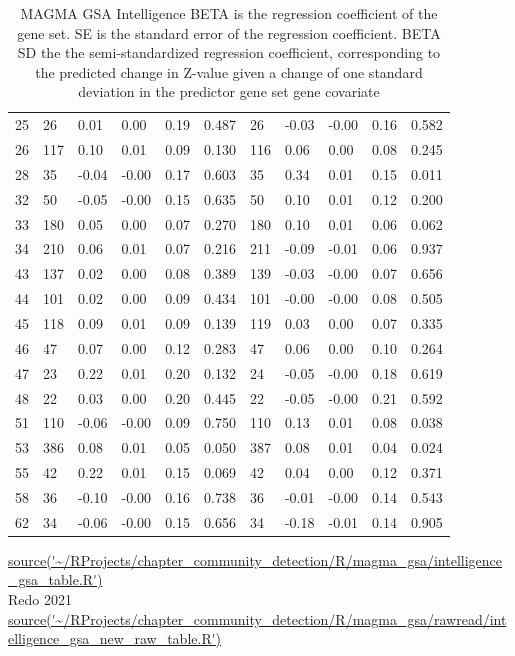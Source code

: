 \begin{table}[ht]
\begin{tabular}{cllllllllll}
  25 & 26 & 0.01 & 0.00 & 0.19 & 0.487 & 26 & -0.03 & -0.00 & 0.16 & 0.582 \\ 
  26 & 117 & 0.10 & 0.01 & 0.09 & 0.130 & 116 & 0.06 & 0.00 & 0.08 & 0.245 \\ 
  28 & 35 & -0.04 & -0.00 & 0.17 & 0.603 & 35 & 0.34 & 0.01 & 0.15 & 0.011 \\ 
  32 & 50 & -0.05 & -0.00 & 0.15 & 0.635 & 50 & 0.10 & 0.01 & 0.12 & 0.200 \\ 
  33 & 180 & 0.05 & 0.00 & 0.07 & 0.270 & 180 & 0.10 & 0.01 & 0.06 & 0.062 \\ 
  34 & 210 & 0.06 & 0.01 & 0.07 & 0.216 & 211 & -0.09 & -0.01 & 0.06 & 0.937 \\ 
  43 & 137 & 0.02 & 0.00 & 0.08 & 0.389 & 139 & -0.03 & -0.00 & 0.07 & 0.656 \\ 
  44 & 101 & 0.02 & 0.00 & 0.09 & 0.434 & 101 & -0.00 & -0.00 & 0.08 & 0.505 \\ 
  45 & 118 & 0.09 & 0.01 & 0.09 & 0.139 & 119 & 0.03 & 0.00 & 0.07 & 0.335 \\ 
  46 & 47 & 0.07 & 0.00 & 0.12 & 0.283 & 47 & 0.06 & 0.00 & 0.10 & 0.264 \\ 
  47 & 23 & 0.22 & 0.01 & 0.20 & 0.132 & 24 & -0.05 & -0.00 & 0.18 & 0.619 \\ 
  48 & 22 & 0.03 & 0.00 & 0.20 & 0.445 & 22 & -0.05 & -0.00 & 0.21 & 0.592 \\ 
  51 & 110 & -0.06 & -0.00 & 0.09 & 0.750 & 110 & 0.13 & 0.01 & 0.08 & 0.038 \\ 
  53 & 386 & 0.08 & 0.01 & 0.05 & 0.050 & 387 & 0.08 & 0.01 & 0.04 & 0.024 \\ 
  55 & 42 & 0.22 & 0.01 & 0.15 & 0.069 & 42 & 0.04 & 0.00 & 0.12 & 0.371 \\ 
  58 & 36 & -0.10 & -0.00 & 0.16 & 0.738 & 36 & -0.01 & -0.00 & 0.14 & 0.543 \\ 
  62 & 34 & -0.06 & -0.00 & 0.15 & 0.656 & 34 & -0.18 & -0.01 & 0.14 & 0.905 \\ 
   \bottomrule
\end{tabular}
\caption{MAGMA GSA Intelligence  BETA is the regression coefficient of the gene set. SE is the standard error of the regression coefficient. BETA SD the the semi-standardized regression coefficient, corresponding to the predicted
change in Z-value given a change of one standard deviation in the predictor gene set  gene covariate } 
\tiny\url{source('~/RProjects/chapter_community_detection/R/magma_gsa/intelligence_gsa_table.R')}\\
Redo 2021 \url{source('~/RProjects/chapter_community_detection/R/magma_gsa/rawread/intelligence_gsa_new_raw_table.R')}
\label{tab:MAGMA GSA Intelligence }
\end{table}

